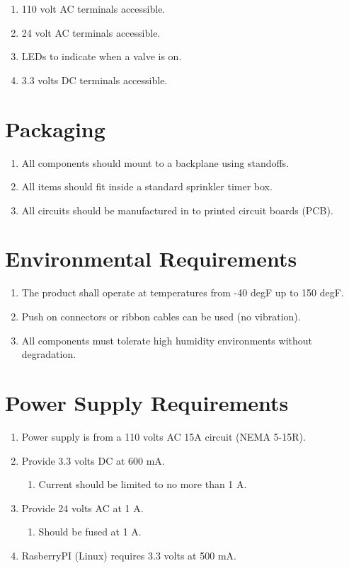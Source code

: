 \documentclass[12pt,letterpaper]{article}
\begin{document}
\begin{enumerate}
	\item 110 volt AC terminals accessible.
	\item 24 volt AC terminals accessible.
	\item LEDs to indicate when a valve is on.
	\item 3.3 volts DC terminals accessible.
\end{enumerate}

\pagebreak

\section{Packaging}

\begin{enumerate}
	\item All components should mount to a backplane using standoffs.
	\item All items should fit inside a standard sprinkler timer box.
	\item All circuits should be manufactured in to printed circuit boards (PCB).
\end{enumerate}

\section{Environmental Requirements}

\begin{enumerate}
\item The product shall operate at temperatures from -40 degF
		up to 150 degF.
\item Push on connectors or ribbon cables can be used (no vibration).
\item All components must tolerate high humidity environments without
	degradation.
\end{enumerate}

\section{Power Supply Requirements}

\begin{enumerate}
	\item Power supply is from a 110 volts AC 15A circuit (NEMA 5-15R).
	\item Provide 3.3 volts DC at 600 mA.
	\begin{enumerate}
		\item Current should be limited to no more than 1 A.
	\end{enumerate}
	\item Provide 24 volts AC at 1 A.
	\begin{enumerate}
		\item Should be fused at 1 A.
	\end{enumerate}
	\item RasberryPI (Linux) requires 3.3 volts at 500 mA.
\end{enumerate}


\pagebreak
\printbibliography[heading=bibintoc]
\end{document}
